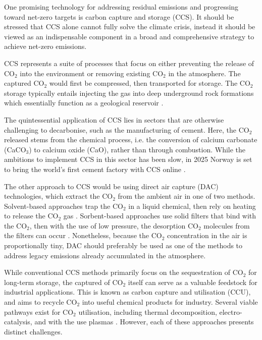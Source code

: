 One promising technology for addressing residual emissions and progressing toward net-zero targets is carbon capture and storage (CCS). It should be stressed that CCS alone cannot fully solve the climate crisis, instead it should be viewed as an indispensable component in a broad and comprehensive strategy to achieve net-zero emissions. 

CCS represents a suite of  processes that focus on either preventing the release of CO$_2$ into the environment or removing existing CO$_2$ in the atmosphere. The captured CO$_2$ would first be compressed, then transported for storage. The CO$_2$ storage typically entails injecting the gas into deep underground rock formations which essentially function as a geological reservoir \cite{IEA2020}.

The quintessential application of CCS lies in sectors that are otherwise challenging to decarbonise, such as the manufacturing of cement. Here, the CO$_2$ released stems from the chemical process, i.e. the conversion of calcium carbonate (CaCO$_3$) to calcium oxide (CaO), rather than through combustion. While the ambitions to implement CCS in this sector has been slow, in 2025 Norway is set to bring the world’s first cement factory with CCS online \cite{brevikccs2024mechanical}. 

The other approach to CCS would be using direct air capture (DAC) technologies, which extract the CO$_2$ from the ambient air in one of two methods. Solvent-based approaches trap the CO$_2$ in a liquid chemical, then rely on heating to release the CO$_2$ gas \cite{An2023}. Sorbent-based approaches use solid filters that bind with the CO$_2$, then with the use of low pressure, the desorption CO$_2$ molecules from the filters can occur \cite{An2023}. Nonetheless, because the CO$_2$ concentration in the air is proportionally tiny, DAC should preferably be used as one of the methods to address legacy emissions already accumulated in the atmosphere.

While conventional CCS methods primarily focus on the sequestration of CO$_2$ for long-term storage, the captured of CO$_2$ itself can serve as a valuable feedstock for industrial applications. This is known as carbon capture and utilisation (CCU), and aims to recycle CO$_2$ into useful chemical products for industry. Several viable pathways exist for CO$_2$ utilisation, including thermal decomposition, electro-catalysis, and with the use plasmas \cite{Khunda2023}. However, each of these approaches presents distinct challenges.


